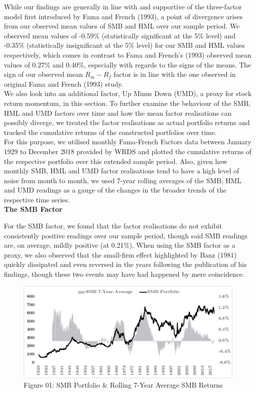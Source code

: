 \documentclass[12pt]{article}
\begin{document}
\noindent While our findings are generally in line with and supportive of the three-factor model first introduced by Fama and French (1993), a point of divergence arises from our observed mean values of SMB and HML over our sample period. We observed mean values of -0.59\% (statistically significant at the 5\% level) and -0.35\% (statistically insignificant at the 5\% level) for our SMB and HML values respectively, which comes in contrast to Fama and French's (1993) observed mean values of 0.27\% and 0.40\%, especially with regards to the signs of the means. The sign of our observed mean $R_m - R_f$ factor is in line with the one observed in original Fama and French (1993) study.\\

\noindent We also look into an additional factor, Up Minus Down (UMD), a proxy for stock return momentum, in this section. To further examine the behaviour of the SMB, HML and UMD factors over time and how the mean factor realisations can possibly diverge, we treated the factor realisations as actual portfolio returns and tracked the cumulative returns of the constructed portfolios over time.\\

\noindent For this purpose, we utilised monthly Fama-French Factors data between January 1929 to December 2018 provided by WRDS and plotted the cumulative returns of the respective portfolio over this extended sample period. Also, given how monthly SMB, HML and UMD factor realisations tend to have a high level of noise from month to month, we used 7-year rolling averages of the SMB, HML and UMD readings as a gauge of the changes in the broader trends of the respective time series.\\

\noindent \textbf{The SMB Factor}

\noindent For the SMB factor, we found that the factor realisations do not exhibit consistently positive readings over our sample period, though said SMB readings are, on average, mildly positive (at 0.21\%). When using the SMB factor as a proxy, we also observed that the small-firm effect highlighted by Banz (1981) quickly dissipated and even reversed in the years following the publication of his findings, though these two events may have had happened by mere coincidence.\\

\begin{figure}[h]
	\centering
	\includegraphics[width=0.83\linewidth,trim=4 4 4 4,clip]{SMB01}
	\caption*{Figure 01: SMB Portfolio \& Rolling 7-Year Average SMB Returns}
	\label{fig:label}
\end{figure}
\end{document}
